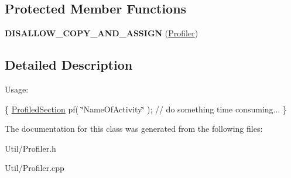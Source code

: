 \subsection*{\-Protected \-Member \-Functions}
\begin{DoxyCompactItemize}
\item 
\hypertarget{class_profiler_aea7082b3ac45f3e77f163e7647c03b67}{
{\bfseries \-D\-I\-S\-A\-L\-L\-O\-W\-\_\-\-C\-O\-P\-Y\-\_\-\-A\-N\-D\-\_\-\-A\-S\-S\-I\-G\-N} (\hyperlink{class_profiler}{\-Profiler})}
\label{class_profiler_aea7082b3ac45f3e77f163e7647c03b67}

\end{DoxyCompactItemize}


\subsection{\-Detailed \-Description}
\-Usage\-:

\{ \hyperlink{class_profiled_section}{\-Profiled\-Section} pf( \char`\"{}\-Name\-Of\-Activity\char`\"{} ); // do something time consuming... \} 

\-The documentation for this class was generated from the following files\-:\begin{DoxyCompactItemize}
\item 
\-Util/\-Profiler.\-h\item 
\-Util/\-Profiler.\-cpp\end{DoxyCompactItemize}
